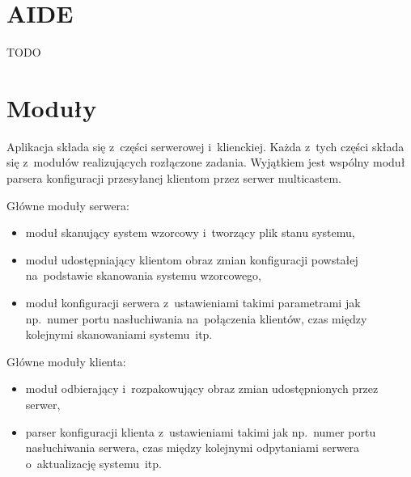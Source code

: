 \documentclass[thesis]{subfiles}
\begin{document}
\begin{itemize}
\end{itemize}


\section{AIDE}
\label{sec:aide}

TODO


\section{Moduły}

Aplikacja składa się z~części serwerowej i~klienckiej. Każda z~tych części składa się z~modułów realizujących rozłączone zadania. Wyjątkiem jest wspólny moduł parsera konfiguracji przesyłanej klientom przez serwer multicastem.

Główne moduły serwera:\mynobreakpar
\begin{itemize}
	\item moduł skanujący system wzorcowy i~tworzący plik stanu systemu,
	\item moduł udostępniający klientom obraz zmian konfiguracji powstałej na~podstawie skanowania systemu wzorcowego,
	\item moduł konfiguracji serwera z~ustawieniami takimi parametrami jak np.~numer portu nasłuchiwania na~połączenia klientów, czas między kolejnymi skanowaniami systemu~itp.
\end{itemize}

Główne moduły klienta:\mynobreakpar
\begin{itemize}
	\item moduł odbierający i~rozpakowujący obraz zmian udostępnionych przez serwer,
	\item parser konfiguracji klienta z~ustawieniami takimi jak np.~numer portu nasłuchiwania serwera, czas między kolejnymi odpytaniami serwera o~aktualizację systemu~itp.
\end{itemize}
\end{document}
